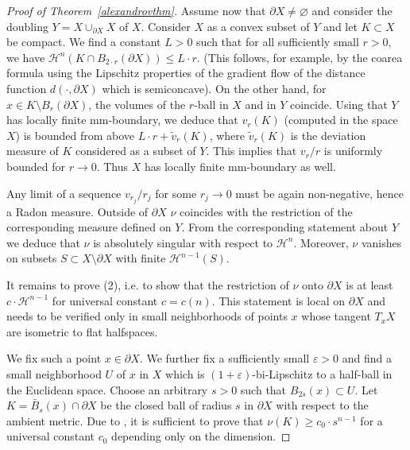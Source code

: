 \documentclass[12pt,leqno,intlimits]{amsart}
\numberwithin{equation}{section}
\theoremstyle{definition}
\theoremstyle{remark}
\newcommand{\vol}{\mathrm{vol}}
\def\emptyset{\varnothing}
\begin{document}
\begin{proof}[Proof of Theorem~\ref{alexandrovthm}]

Assume now that $\partial X\ne\emptyset$ and consider the doubling $Y=X\cup _{\partial X} X$ of $X$. Consider $X$ as a convex subset of $Y$ and let $K\subset X$ be compact. We find a constant $L>0$ such that for all sufficiently small $r>0$, we have $\mathcal H^n (K\cap B_{2{\cdot}r} (\partial X)) \leq L \cdot r$. (This follows, for example, by the coarea formula using the Lipschitz properties of the gradient flow of the distance function $d(\cdot, \partial X)$ which is semiconcave). On the other hand, for $x\in K\setminus B_r (\partial X)$, the volumes of the $r$-ball in $X$ and in $Y$ coincide. Using that $Y$ has locally finite mm-boundary, we deduce that $v_r(K)$ (computed in the space $X$) is bounded from above $L\cdot r + \tilde v_r (K)$, where $\tilde v_r (K)$ is the deviation measure of $K$ considered as a subset of $Y$. This implies that $v_r /r$ is uniformly bounded for $r\to 0$. Thus $X$ has locally finite mm-boundary as well.

Any limit of a sequence $v_{r_j} /r_j$ for some $r_j\to 0$ must be again non-negative, hence a Radon measure. Outside of $\partial X$
$\nu$ coincides with the restriction of the corresponding measure defined on $Y$. From the corresponding statement about $Y$ we deduce that $\nu$ is absolutely singular with respect to $\mathcal H^n$. Moreover, $\nu$ vanishes on subsets $S\subset X\setminus \partial X$ with finite $\mathcal H^{n-1} (S)$.

It remains to prove (2), i.e. to show that the restriction of $\nu$ onto $\partial X$ is at least
$c\cdot \mathcal H^{n-1}$ for universal constant $c=c(n)$. This statement is local on $\partial X$ and needs to be verified only in small neighborhoods of points $x$ whose tangent $T_xX$
are isometric to flat halfspaces.

We fix such a point $x\in \partial X$. We further fix a sufficiently small $\varepsilon >0$ and find
a small neighborhood $U$ of $x$ in $X$ which is
$(1+\varepsilon)$-bi-Lipschitz to a half-ball in the Euclidean space. Choose an arbitrary $s>0$ such that $B_{2s} (x)\subset U$.
Let $K= \bar B_s (x) \cap \partial X$ be the closed ball of radius $s$ in $\partial X$ with respect to the ambient metric. Due to \cite[Section 1.6]{Evans},
 it is sufficient to prove that $\nu (K) \geq c_0 \cdot s^{n-1}$ for a universal constant $c_0$ depending only on the dimension.


\end{proof}
\end{document}

